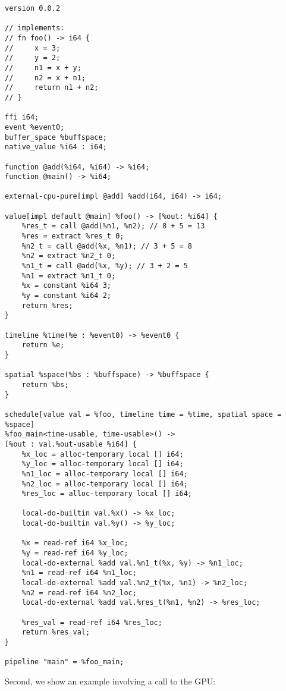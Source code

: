 \begin{lstlisting}
version 0.0.2

// implements:
// fn foo() -> i64 {
//     x = 3;
//     y = 2;
//     n1 = x + y;
//     n2 = x + n1;
//     return n1 + n2;
// }

ffi i64;
event %event0;
buffer_space %buffspace;
native_value %i64 : i64;

function @add(%i64, %i64) -> %i64;
function @main() -> %i64;

external-cpu-pure[impl @add] %add(i64, i64) -> i64;

value[impl default @main] %foo() -> [%out: %i64] {
    %res_t = call @add(%n1, %n2); // 8 + 5 = 13
    %res = extract %res_t 0;
    %n2_t = call @add(%x, %n1); // 3 + 5 = 8
    %n2 = extract %n2_t 0;
    %n1_t = call @add(%x, %y); // 3 + 2 = 5
    %n1 = extract %n1_t 0;
    %x = constant %i64 3;
    %y = constant %i64 2;
    return %res;
}

timeline %time(%e : %event0) -> %event0 {
    return %e;
}

spatial %space(%bs : %buffspace) -> %buffspace {
    return %bs;
}

schedule[value val = %foo, timeline time = %time, spatial space = %space]
%foo_main<time-usable, time-usable>() ->
[%out : val.%out-usable %i64] {
    %x_loc = alloc-temporary local [] i64;
    %y_loc = alloc-temporary local [] i64;
    %n1_loc = alloc-temporary local [] i64;
    %n2_loc = alloc-temporary local [] i64;
    %res_loc = alloc-temporary local [] i64;

    local-do-builtin val.%x() -> %x_loc;
    local-do-builtin val.%y() -> %y_loc;

    %x = read-ref i64 %x_loc;
    %y = read-ref i64 %y_loc;
    local-do-external %add val.%n1_t(%x, %y) -> %n1_loc;
    %n1 = read-ref i64 %n1_loc;
    local-do-external %add val.%n2_t(%x, %n1) -> %n2_loc;
    %n2 = read-ref i64 %n2_loc;
    local-do-external %add val.%res_t(%n1, %n2) -> %res_loc;
    
    %res_val = read-ref i64 %res_loc;
    return %res_val;
}

pipeline "main" = %foo_main;
\end{lstlisting}

Second, we show an example involving a call to the GPU:

